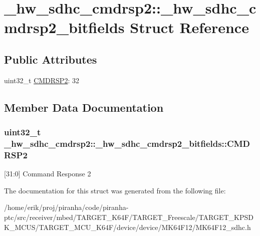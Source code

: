 \hypertarget{struct__hw__sdhc__cmdrsp2_1_1__hw__sdhc__cmdrsp2__bitfields}{}\section{\+\_\+hw\+\_\+sdhc\+\_\+cmdrsp2\+:\+:\+\_\+hw\+\_\+sdhc\+\_\+cmdrsp2\+\_\+bitfields Struct Reference}
\label{struct__hw__sdhc__cmdrsp2_1_1__hw__sdhc__cmdrsp2__bitfields}
\subsection*{Public Attributes}
\begin{DoxyCompactItemize}
\item 
uint32\+\_\+t \hyperlink{struct__hw__sdhc__cmdrsp2_1_1__hw__sdhc__cmdrsp2__bitfields_a62db02fcdea087bb6eb7b407b183b806}{C\+M\+D\+R\+S\+P2}\+: 32
\end{DoxyCompactItemize}


\subsection{Member Data Documentation}
\subsubsection[{\texorpdfstring{C\+M\+D\+R\+S\+P2}{CMDRSP2}}]{\setlength{\rightskip}{0pt plus 5cm}uint32\+\_\+t \+\_\+hw\+\_\+sdhc\+\_\+cmdrsp2\+::\+\_\+hw\+\_\+sdhc\+\_\+cmdrsp2\+\_\+bitfields\+::\+C\+M\+D\+R\+S\+P2}\hypertarget{struct__hw__sdhc__cmdrsp2_1_1__hw__sdhc__cmdrsp2__bitfields_a62db02fcdea087bb6eb7b407b183b806}{}\label{struct__hw__sdhc__cmdrsp2_1_1__hw__sdhc__cmdrsp2__bitfields_a62db02fcdea087bb6eb7b407b183b806}
\mbox{[}31\+:0\mbox{]} Command Response 2 

The documentation for this struct was generated from the following file\+:\begin{DoxyCompactItemize}
\item 
/home/erik/proj/piranha/code/piranha-\/ptc/src/receiver/mbed/\+T\+A\+R\+G\+E\+T\+\_\+\+K64\+F/\+T\+A\+R\+G\+E\+T\+\_\+\+Freescale/\+T\+A\+R\+G\+E\+T\+\_\+\+K\+P\+S\+D\+K\+\_\+\+M\+C\+U\+S/\+T\+A\+R\+G\+E\+T\+\_\+\+M\+C\+U\+\_\+\+K64\+F/device/device/\+M\+K64\+F12/M\+K64\+F12\+\_\+sdhc.\+h\end{DoxyCompactItemize}
